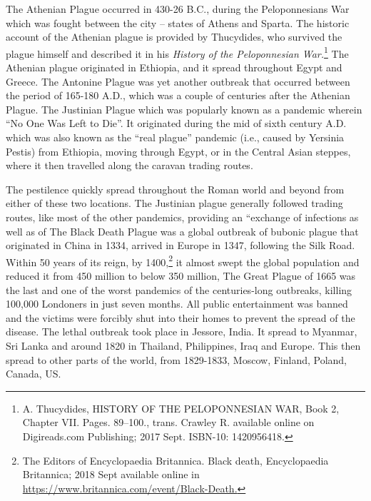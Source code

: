 \begin{multicols}{2}
\noi
The Athenian Plague occurred in 430-26 B.C., during the Peloponnesians War which was
fought between the city – states of Athens and Sparta. The historic account of the Athenian
plague is provided by Thucydides, who survived the plague himself and described it in
his \textit{History of the Peloponnesian War.}\footnote{A. Thucydides, HISTORY OF THE PELOPONNESIAN WAR, Book 2, Chapter VII. Pages. 89–100., trans. Crawley R. available online on Digireads.com Publishing; 2017 Sept. ISBN-10: 1420956418.} The Athenian plague originated in Ethiopia, and it spread throughout Egypt and Greece. The Antonine Plague was yet another outbreak that
occurred between the period of 165-180 A.D., which was a couple of centuries after the
Athenian Plague. The Justinian Plague which was popularly known as a pandemic wherein
“No One Was Left to Die”. It originated during the mid of sixth century A.D. which was also
known as the “real plague” pandemic (i.e., caused by Yersinia Pestis) from Ethiopia, moving
through Egypt, or in the Central Asian steppes, where it then travelled along the caravan
trading routes. 

\noi
The pestilence quickly spread throughout the Roman world and beyond from either of these
two locations. The Justinian plague generally followed trading routes, like most of the other
pandemics, providing an “exchange of infections as well as of The Black Death Plague was a
global outbreak of bubonic plague that originated in China in 1334, arrived in Europe in
1347, following the Silk Road. Within 50 years of its reign, by 1400,\footnote{The Editors of Encyclopaedia Britannica. Black death, Encyclopaedia Britannica; 2018 Sept available online in  \url{https://www.britannica.com/event/Black-Death.}}  it almost swept the
global population and reduced it from 450 million to below 350 million, The Great Plague
of 1665 was the last and one of the worst pandemics of the centuries-long
outbreaks, killing 100,000 Londoners in just seven months. All public
entertainment was banned and the victims were forcibly shut into their homes to prevent the spread of the disease. The lethal outbreak took place in Jessore, India. It
spread to Myanmar, Sri Lanka and around 1820 in Thailand, Philippines, Iraq and Europe.
This then spread to other parts of the world, from 1829-1833, Moscow, Finland, Poland,
Canada, US. 


\end{multicols}
